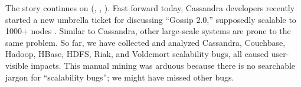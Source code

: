 The story continues on (, , \etc).  Fast forward today,
Cassandra developers recently started a new umbrella ticket for discussing
``Gossip 2.0,''  supposedly scalable to 1000+
nodes \cite{Gossip20, Gossip20Mail}.
Similar to Cassandra, other large-scale systems are prone to the same
problem.  So far, we have collected and analyzed \totCass Cassandra, \totCouch
Couchbase, \totHadoop Hadoop, \totHBase HBase, \totHDFS HDFS, \totRiak
Riak, and \totVold Voldemort scalability bugs, all caused user-visible
impacts.
%
This manual mining was arduous because there is no searchable jargon for
``scalability bugs''; we might have missed other bugs.
%

